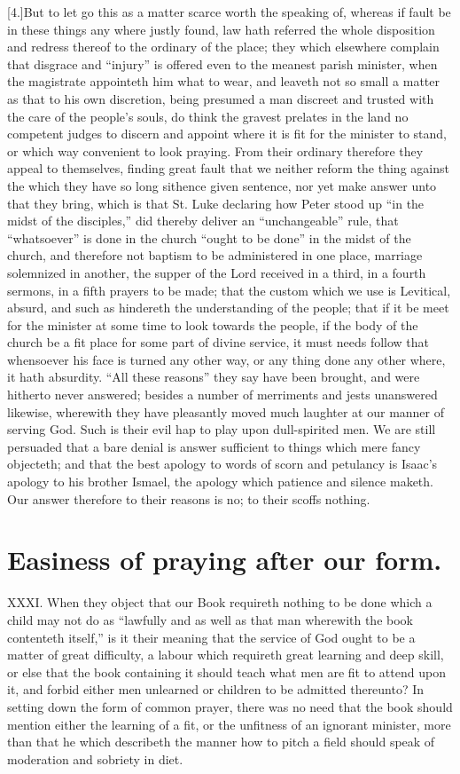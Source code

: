 [4.]But to let go this as a matter scarce worth the speaking of, whereas if fault be in these things any where justly found, law hath referred the whole disposition and redress thereof to the ordinary of the place; they which elsewhere complain that disgrace and “injury” is offered even to the meanest parish minister, when the magistrate appointeth him what to wear, and leaveth not so small a matter as that to his own discretion, being presumed a man discreet and trusted with the care of the people’s souls, do think the gravest prelates in the land no competent judges to discern and appoint where it is fit for the minister to stand, or which way convenient to look praying. From their ordinary therefore they appeal  to themselves, finding great fault that we neither reform the thing against the which they have so long sithence given sentence, nor yet make answer unto that they bring, which is that St. Luke declaring how Peter stood up “in the midst of the disciples,” did thereby deliver an “unchangeable” rule, that “whatsoever” is done in the church “ought to be  done” in the midst of the church,
 and therefore not baptism to be administered in one place, marriage solemnized in another, the supper of the Lord received in a third, in a fourth sermons, in a fifth prayers to be made; that the custom which we use is Levitical, absurd, and such as hindereth the understanding of the people; that if it be meet for the minister at some time to look towards the people, if the body of the church be a fit place for some part of divine service, it must needs follow that whensoever his face is turned any other way, or any thing done any other where, it hath absurdity. “All these reasons” they say have been brought, and were hitherto never answered; besides a number of merriments and jests unanswered likewise, wherewith they have pleasantly moved much laughter at our manner of serving God. Such is their evil hap to play upon dull-spirited men. We are still persuaded that a bare denial is answer sufficient to things which mere fancy objecteth; and that the best apology to words of scorn and petulancy is Isaac’s apology to his brother Ismael, the apology which patience and silence maketh. Our answer therefore to their reasons is no; to their scoffs nothing.


\section*{Easiness of praying after our form.}
XXXI. When they object that our Book requireth nothing to be done which a child may not do as “lawfully and as well as that man wherewith the book contenteth itself,” is it their meaning that the service of God ought to be a matter of great difficulty, a labour which requireth great learning and  deep skill, or else that the book containing it should teach what men are fit to attend upon it, and forbid either men unlearned or children to be admitted thereunto?
 In setting down the form of common prayer, there was no need that the book should mention either the learning of a fit, or the unfitness of an ignorant minister, more than that he which describeth the manner how to pitch a field should speak of moderation and sobriety in diet.

